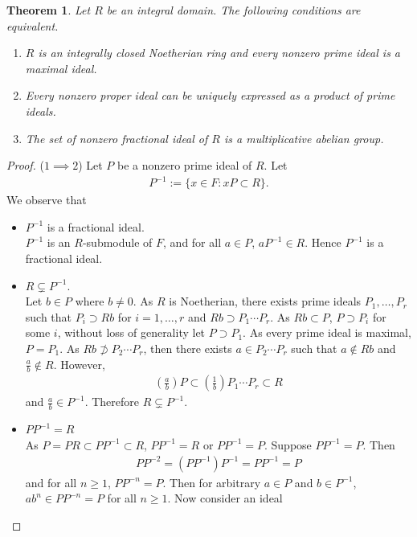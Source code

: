 \documentclass[12pt]{article}
\theoremstyle{plain}
\newtheorem{theorem}{Theorem}[section]
\theoremstyle{remark}
\theoremstyle{definition}
\begin{document}
\begin{theorem}\label{Theorem 1.3.7.}
    Let $R$ be an integral domain. The following conditions are equivalent.
    \begin{enumerate}
        \item $R$ is an integrally closed Noetherian ring and every nonzero prime ideal is a maximal ideal.
        \item Every nonzero proper ideal can be uniquely expressed as a product of prime ideals.
        \item The set of nonzero fractional ideal of $R$ is a multiplicative abelian group.
    \end{enumerate}
\end{theorem}
\begin{proof}
    ($1\implies 2$) Let $P$ be a nonzero prime ideal of $R$. Let
    \begin{align*}
        P^{-1}:=\{x\in F:xP\subset R\}.
    \end{align*}
    We observe that
    \begin{itemize}
        \item $P^{-1}$ is a fractional ideal.\\
        $P^{-1}$ is an $R$-submodule of $F$, and for all $a\in P$, $aP^{-1}\in R$. Hence $P^{-1}$ is a fractional ideal.
        \item $R\subsetneq P^{-1}$. \\
        Let $b\in P$ where $b\neq 0$. As $R$ is Noetherian, there exists prime ideals $P_1,\dots,P_r$ such that $P_i\supset Rb$ for $i=1,\dots,r$ and $Rb\supset P_1\cdots P_r$. As $Rb\subset P$, $P\supset P_i$ for some $i$, without loss of generality let $P\supset P_1$. As every prime ideal is maximal, $P=P_1.$ As $Rb\not\supset P_2\cdots P_r$, then there exists $a\in P_2\cdots P_r$ such that $a\notin Rb$ and $\frac{a}{b}\notin R$. However,
        \begin{align*}
            \left(\frac{a}{b}\right)P\subset \left(\frac{1}{b}\right) P_1\cdots P_r\subset R
        \end{align*}
        and $\frac{a}{b}\in P^{-1}$. Therefore $R\subsetneq P^{-1}$.
        \item $PP^{-1}=R$ \\
        As $P=PR\subset PP^{-1}\subset R$, $PP^{-1}=R$ or $PP^{-1}=P$. Suppose $PP^{-1}=P$. Then
        \begin{align*}
            PP^{-2}=(PP^{-1})P^{-1} = PP^{-1} = P
        \end{align*}
        and for all $n\ge 1$, $PP^{-n}=P$. Then for arbitrary $a\in P$ and $b\in P^{-1}$, $ab^n \in PP^{-n} = P$ for all $n\ge 1$. Now consider an ideal

\end{itemize}
\end{proof}
\end{document}
